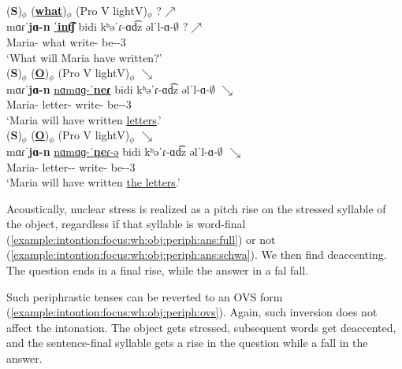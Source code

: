 \begin{exe}
	\ex \label{example:intontion:focus:wh:obj:periph} \begin{xlist}
		\ex \glll (\textbf{S})$_\phi$ (\underline{\textbf{what}})$_\phi$ (Pro V lightV)$_\phi$ ?$\nearrow$ \\
		mɑɾˈ\textbf{jɑ-n} \underline{ˈ\textbf{int͡ʃ}} bidi kʰəˈɾ-ɑd͡z əlˈl-ɑ-$\emptyset$ ?$\nearrow$ \\
		Maria-{} what {\fut} write-{\rptcp} be-{\thgloss}-3{\sg} \\ 
		\trans `What will Maria have written?'
		\\ 
		\ex \glll (\textbf{S})$_\phi$ (\underline{\textbf{O}})$_\phi$ (Pro V lightV)$_\phi$  $\searrow$ \\
		mɑɾˈ\textbf{jɑ-n} \underline{nɑmɑɡ-ˈ\textbf{neɾ}} bidi kʰəˈɾ-ɑd͡z əlˈl-ɑ-$\emptyset$  $\searrow$ \\
		Maria-{} letter-{\pl} {\fut} write-{\rptcp} be-{\thgloss}-3{\sg} \\ 
		\trans `Maria will have written \underline{letters}.'
		\label{example:intontion:focus:wh:obj:periph:ans:full}
		\\ 
		\ex \glll (\textbf{S})$_\phi$ (\underline{\textbf{O}})$_\phi$ (Pro V lightV)$_\phi$  $\searrow$ \\
		mɑɾˈ\textbf{jɑ-n} \underline{nɑmɑɡ-ˈ\textbf{ne}ɾ-ə} bidi kʰəˈɾ-ɑd͡z əlˈl-ɑ-$\emptyset$  $\searrow$ \\
		Maria-{} letter-{\pl}-{} {\fut} write-{\rptcp} be-{\thgloss}-3{\sg} \\ 
		\trans `Maria will have written \underline{the letters}.'
		\label{example:intontion:focus:wh:obj:periph:ans:schwa}
		\\ 
	\end{xlist}
\end{exe}

Acoustically, nuclear stress is realized as a pitch rise on the stressed syllable of the object, regardless if that syllable is word-final (\ref{example:intontion:focus:wh:obj:periph:ans:full}) or not (\ref{example:intontion:focus:wh:obj:periph:ans:schwa}). We then find deaccenting. The question ends in a final rise, while the answer in a fal fall.  

Such periphrastic tenses can be reverted to an OVS form (\ref{example:intontion:focus:wh:obj:periph:ovs}). Again, such inversion does not affect the intonation. The object gets stressed, subsequent words get deaccented, and the sentence-final syllable gets a rise in the question while a fall in the answer. 


